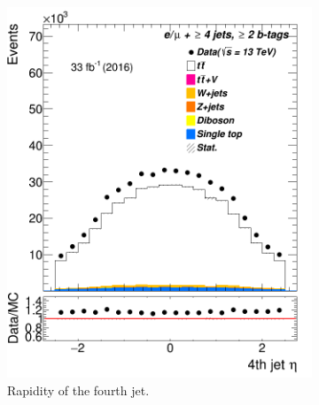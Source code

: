 \begin{figure}
\begin{subfigure}{0.25\textwidth}
	\includegraphics[width=\linewidth]{ControlPlots_emujets_2016_4incl_2incl/jet3_eta_emujets_2016.png}
	\caption{Rapidity of the fourth jet.} \label{fig:4dc}
\end{subfigure}\hspace*{1.0cm}
\begin{subfigure}{0.25\textwidth}

\end{subfigure}
\end{figure}
